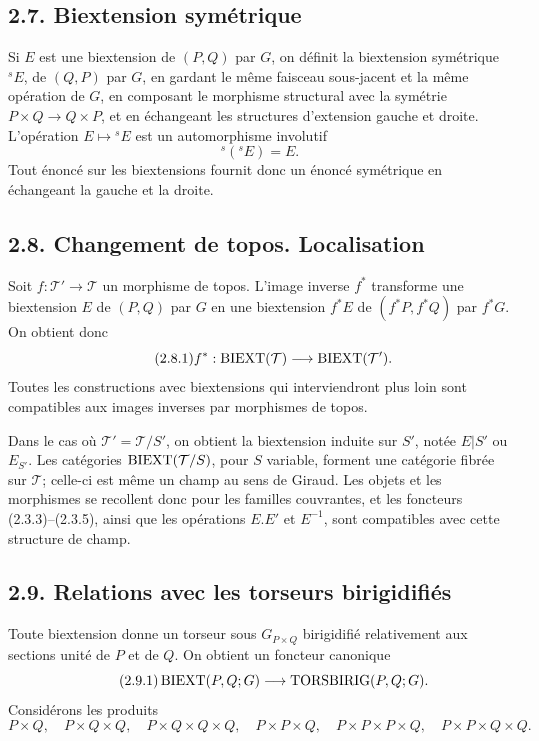 \documentclass[11pt]{article}
\begin{document}
\subsection*{2.7. Biextension symétrique}
Si \(E\) est une biextension de \((P,Q)\) par \(G\), on définit la biextension symétrique \({}^sE\), de \((Q,P)\) par \(G\), en gardant le même faisceau sous-jacent et la même opération de \(G\), en composant le morphisme structural avec la symétrie \(P\times Q\to Q\times P\), et en échangeant les structures d'extension gauche et droite.  L'opération \(E\mapsto{}^sE\) est un automorphisme involutif
\begin{equation}\tag{2.7.1}
  {}^s({}^sE)=E.
\end{equation}
Tout énoncé sur les biextensions fournit donc un énoncé symétrique en échangeant la gauche et la droite.

\subsection*{2.8. Changement de topos. Localisation}
Soit \(f:\mathcal T'\to\mathcal T\) un morphisme de topos.  L'image inverse \(f^*\) transforme une biextension \(E\) de \((P,Q)\) par \(G\) en une biextension \(f^*E\) de \((f^*P,f^*Q)\) par \(f^*G\).  On obtient donc
\begin{equation}\tag{2.8.1}
  f^*:\operatorname{BIEXT}(\mathcal T)\longrightarrow\operatorname{BIEXT}(\mathcal T').
\end{equation}
Toutes les constructions avec biextensions qui interviendront plus loin sont compatibles aux images inverses par morphismes de topos.

Dans le cas où \(\mathcal T'=\mathcal T/S'\), on obtient la biextension induite sur \(S'\), notée \(E|S'\) ou \(E_{S'}\).  Les catégories \(\operatorname{BIEXT}(\mathcal T/S)\), pour \(S\) variable, forment une catégorie fibrée sur \(\mathcal T\); celle-ci est même un champ au sens de Giraud.  Les objets et les morphismes se recollent donc pour les familles couvrantes, et les foncteurs (2.3.3)--(2.3.5), ainsi que les opérations \(E.E'\) et \(E^{-1}\), sont compatibles avec cette structure de champ.

\subsection*{2.9. Relations avec les torseurs birigidifiés}
Toute biextension donne un torseur sous \(G_{P\times Q}\) birigidifié relativement aux sections unité de \(P\) et de \(Q\).  On obtient un foncteur canonique
\begin{equation}\tag{2.9.1}
  \operatorname{BIEXT}(P,Q;G)\longrightarrow\operatorname{TORSBIRIG}(P,Q;G).
\end{equation}
Considérons les produits
\begin{equation}\tag{2.9.2}
  P\times Q,
  \quad P\times Q\times Q,
  \quad P\times Q\times Q\times Q,
  \quad P\times P\times Q,
  \quad P\times P\times P\times Q,
  \quad P\times P\times Q\times Q.
\end{equation}
\end{document}
